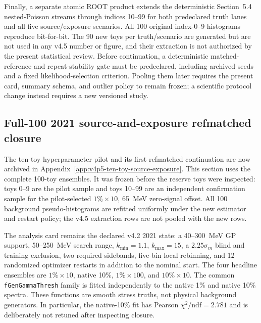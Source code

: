 {Finally, a separate atomic ROOT product extends the deterministic Section~5.4
nested-Poisson streams through indices 10--99 for both predeclared truth lanes and all
five source/exposure scenarios.  All 100 original index-0--9 histograms reproduce
bit-for-bit.  The 90 new toys per truth/scenario are generated but are not used in any
v4.5 number or figure, and their extraction is not authorized by the present
statistical review.  Before continuation, a deterministic matched-reference and
repeat-stability gate must be predeclared, including archived seeds and a fixed
likelihood-selection criterion.  Pooling them later requires the present card,
summary schema, and outlier policy to remain frozen; a scientific protocol change
instead requires a new versioned study.

\FloatBarrier
}

\subsection{Full-100 2021 source-and-exposure refmatched closure}
\label{sec:v4p6-exposure-refmatched-full100}

The ten-toy hyperparameter pilot and its first refmatched continuation are now
archived in Appendix~\ref{app:v4p5-ten-toy-source-exposure}.  This section uses the
complete 100-toy ensembles.  It was frozen before the reserve toys were inspected:
toys 0--9 are the pilot sample and toys 10--99 are an independent confirmation
sample for the pilot-selected $1\%\times10$, 65~MeV zero-signal offset.  All 100
background pseudo-histograms are refitted uniformly under the new estimator and
restart policy; the v4.5 extraction rows are not pooled with the new rows.

The analysis card remains the declared v4.2 2021 state: a 40--300~MeV GP support,
50--250~MeV search range, $k_{\min}=1.1$, $k_{\max}=15$, a
$2.25\sigma_m$ blind and training exclusion, two required sidebands, five-bin local
rebinning, and 12 randomized optimizer restarts in addition to the nominal start.
The four headline ensembles are $1\%\times10$, native 10\%, $1\%\times100$, and
$10\%\times10$.  The common \texttt{fGenGammaThresh} family is fitted independently
to the native 1\% and native 10\% spectra.  These functions are smooth stress truths,
not physical background generators.  In particular, the native-10\% fit has Pearson
$\chi^2/\mathrm{ndf}=2.781$ and is deliberately not retuned after inspecting closure.

